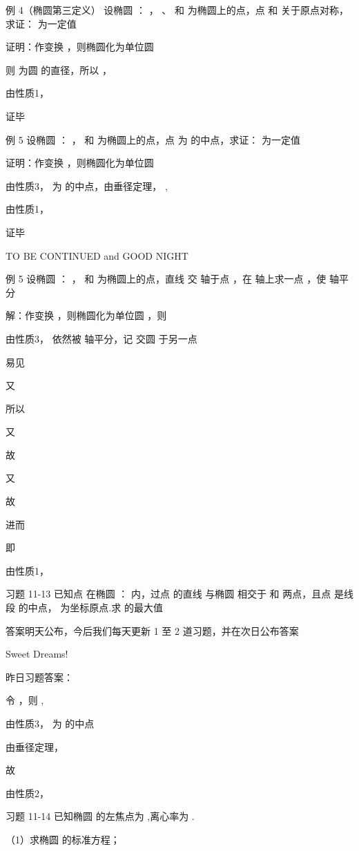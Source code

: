 例 4（椭圆第三定义） 设椭圆 
：
，  、 和  为椭圆上的点，点  和  关于原点对称，求证：  为一定值


证明：作变换  ，则椭圆化为单位圆 

则  为圆  的直径，所以  ，

由性质1， 

证毕

例 5 设椭圆 
：
，  和  为椭圆上的点，点  为  的中点，求证：  为一定值


证明：作变换  ，则椭圆化为单位圆 

由性质3，  为  的中点，由垂径定理，  , 

由性质1， 

证毕

TO BE CONTINUED and GOOD NIGHT

例 5 设椭圆 
：
，  和  为椭圆上的点，直线  交  轴于点  ，在  轴上求一点  ，使  轴平分 


解：作变换  ，则椭圆化为单位圆 ，则 

由性质3，  依然被  轴平分，记  交圆  于另一点 

易见 

又 

所以 

又 

故 

又 

故 

进而 


即 

由性质1， 



习题 11-13 已知点  在椭圆 
：
 内，过点  的直线  与椭圆  相交于  和  两点，且点  是线段  的中点，  为坐标原点.求  的最大值





答案明天公布，今后我们每天更新 1 至 2 道习题，并在次日公布答案

Sweet Dreams!

昨日习题答案：

令  ，则  , 


由性质3，  为  的中点

由垂径定理， 

故 



由性质2， 





习题 11-14 已知椭圆  的左焦点为  ,离心率为  .

（1）求椭圆  的标准方程；

